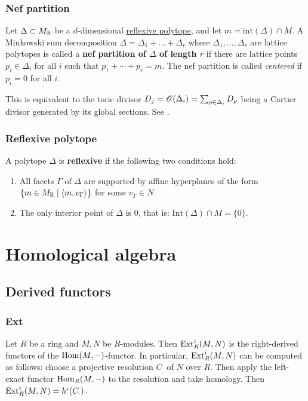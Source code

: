 \documentclass[11pt, english]{article}
\begin{document}
\subsubsection{Nef partition}
\label{nefpartition}
Let $\Delta \subset M_{\mathbb{R}}$ be a $d$-dimensional \hyperref[reflexivepolytope]{reflexive polytope}, and let $m=\mathrm{int}(\Delta) \cap M$. A Minkowski sum decomposition $\Delta=\Delta_1+\dotsc +\Delta_r$ where $\Delta_1,\ldots,\Delta_r$ are lattice polytopes is called a \textbf{nef partition of $\Delta$ of length $r$} if there are lattice points $p_i \in \Delta_i$ for all $i$ such that $p_1+\cdots+p_r = m$. The nef partition is called \emph{centered} if $p_i=0$  for all $i$. 

This is equivalent to the toric divisor $D_j=\operatorname{\mathscr{O}}(\Delta_i)=\sum_{\rho \in \Delta_i} D_\rho$ being a Cartier divisor generated by its global sections. See \cite[Chapter 4.3]{mirrorsymalggeo}.  

\subsubsection{Reflexive polytope}
\label{reflexivepolytope}

A polytope $\Delta$ is \textbf{reflexive} if the following two conditions hold:
\begin{enumerate}
\item All facets $\Gamma$ of $\Delta$ are supported by affine hyperplanes of the form $\{ m \in M_{\mathbb{R}} \mid \langle m,v_\Gamma \rangle \}$ for some $v_\Gamma \in N$.
\item The only interior point of $\Delta$ is $0$, that is: $\mathrm{Int}(\Delta) \cap M = \{0\}$.
\end{enumerate}

\section{Homological algebra}
\subsection{Derived functors}
\subsubsection{Ext}
\label{ext}
Let $R$ be a ring and $M,N$ be $R$-modules. Then $\operatorname{\mathrm{Ext}}_R^i(M,N)$ is the right-derived functors of the $\operatorname{Hom}(M,-)$-functor. In particular, $\operatorname{\mathrm{Ext}}^i_R(M,N)$ can be computed as follows: choose a projective resolution $C_.$ of $N$ over $R$. Then apply the left-exact functor $\operatorname{Hom}_R(M,-)$ to the resolution and take homology. Then $\operatorname{\mathrm{Ext}}_R^i(M,N)=h^i(C_.)$.
\end{document}
